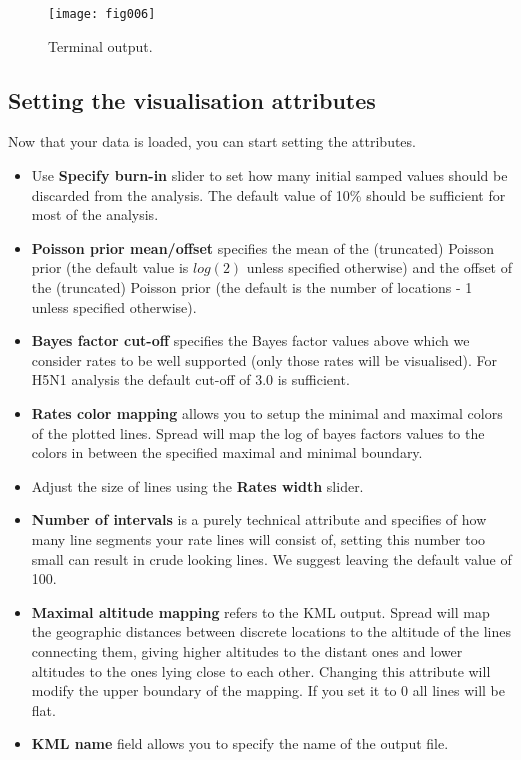 \begin{figure}[H]
\begin{centering}
\texttt{[image: fig006]}
\caption{Terminal output.}
\label{fig:006}
\par\end{centering}
\end{figure}

\subsection{Setting the visualisation attributes}

Now that your data is loaded, you can start setting the attributes.

\begin{itemize}
\item Use \textbf{Specify burn-in} slider to set how many initial samped
values should be discarded from the analysis. The default value of
10\% should be sufficient for most of the analysis.
\item \textbf{Poisson prior mean/offset} specifies the mean of the (truncated)
Poisson prior (the default value is $log(2)$ unless specified otherwise)
and the offset of the (truncated) Poisson prior (the default is the
number of locations - 1 unless specified otherwise).
\item \textbf{Bayes factor cut-off} specifies the Bayes factor values above
which we consider rates to be well supported (only those rates will
be visualised). For H5N1 analysis the default cut-off of 3.0 is sufficient. 
\item \textbf{Rates color mapping} allows you to setup the minimal and maximal
colors of the plotted lines. Spread will map the log of bayes factors
values to the colors in between the specified maximal and minimal
boundary.
\item Adjust the size of lines using the \textbf{Rates width} slider.
\item \textbf{Number of intervals} is a purely technical attribute and specifies
of how many line segments your rate lines will consist of, setting
this number too small can result in crude looking lines. We suggest
leaving the default value of 100.
\item \textbf{Maximal altitude mapping} refers to the KML output. Spread
will map the geographic distances between discrete locations to the
altitude of the lines connecting them, giving higher altitudes to
the distant ones and lower altitudes to the ones lying close to each
other. Changing this attribute will modify the upper boundary of the
mapping. If you set it to 0 all lines will be flat.
\item \textbf{KML name} field allows you to specify the name of the output
file.
\end{itemize}


